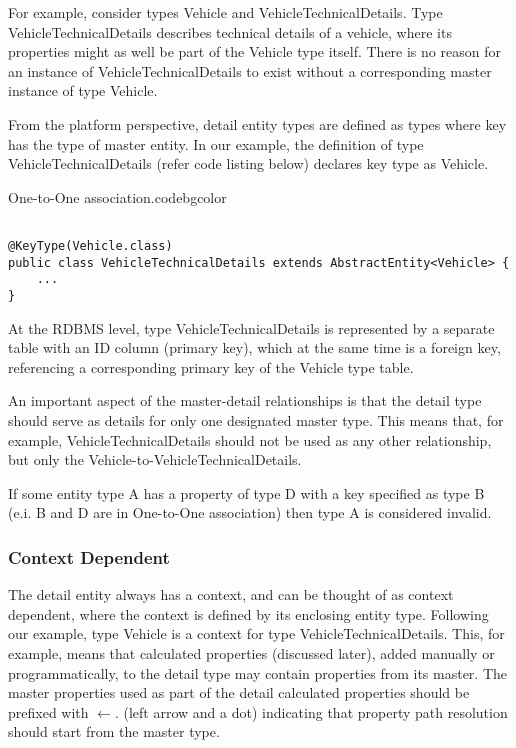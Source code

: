   For example, consider types Vehicle and VehicleTechnicalDetails. Type VehicleTechnicalDetails describes technical details of a vehicle, where its properties might as well be part of the Vehicle type itself. There is no reason for an instance of VehicleTechnicalDetails to exist without a corresponding master instance of type Vehicle.

  From the platform perspective, detail entity types are defined as types where key has the type of master entity. In our example, the definition of type VehicleTechnicalDetails (refer code listing below) declares key type as Vehicle.

  \begin{code}{One-to-One association.}{\label{lst:One2One}}{codebgcolor}
    \begin{lstlisting}

@KeyType(Vehicle.class)
public class VehicleTechnicalDetails extends AbstractEntity<Vehicle> {
    ...
}
    \end{lstlisting}
  \end{code}

  At the RDBMS level, type VehicleTechnicalDetails is represented by a separate table with an ID column (primary key), which at the same time is a foreign key, referencing a corresponding primary key of the Vehicle type table.

  An important aspect of the master-detail relationships is that the detail type should serve as details for only one designated master type. This means that, for example, VehicleTechnicalDetails should not be used as any other relationship, but only the Vehicle-to-VehicleTechnicalDetails.

  If some entity type A has a property of type D with a key specified as type B (e.i. B and D are in One-to-One association) then type A is considered invalid.

  \subsubsection{Context Dependent}

  The detail entity always has a context, and can be thought of as context dependent, where the context is defined by its enclosing entity type. Following our example, type Vehicle is a context for type VehicleTechnicalDetails. This, for example, means that calculated properties (discussed later), added manually or programmatically, to the detail type may contain properties from its master. The master properties used as part of the detail calculated properties should be prefixed with $\leftarrow.$ (left arrow and a dot) indicating that property path resolution should start from the master type.

